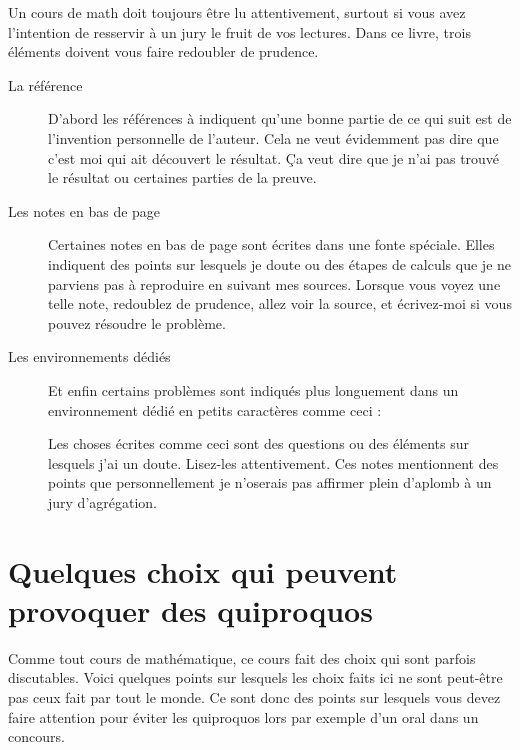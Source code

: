 Un cours de math doit toujours être lu attentivement, surtout si vous avez l'intention de resservir à un jury le fruit de vos lectures. Dans ce livre, trois éléments doivent vous faire redoubler de prudence.

\begin{description}
    \item[La référence \cite{MonCerveau}] 
        D'abord les références à \cite{MonCerveau} indiquent qu'une bonne partie de ce qui suit est de l'invention personnelle de l'auteur. Cela ne veut évidemment pas dire que c'est moi qui ait découvert le résultat. Ça veut dire que je n'ai pas trouvé le résultat ou certaines parties de la preuve.
    \item[Les notes en bas de page]
        Certaines notes en bas de page sont écrites dans une fonte spéciale. Elles indiquent des points sur lesquels je doute ou des étapes de calculs que je ne parviens pas à reproduire en suivant mes sources. Lorsque vous voyez une telle note, redoublez de prudence, allez voir la source, et écrivez-moi si vous pouvez résoudre le problème.
    \item[Les environnements dédiés]       
        Et enfin certains problèmes sont indiqués plus longuement dans un environnement dédié en petits caractères comme ceci :

        \begin{probleme}
            Les choses écrites comme ceci sont des questions ou des éléments sur lesquels j'ai un doute. Lisez-les attentivement. Ces notes mentionnent des points que personnellement je n'oserais pas affirmer plein d'aplomb à un jury d'agrégation.
        \end{probleme}
\end{description}

\section{Quelques choix qui peuvent provoquer des quiproquos}

Comme tout cours de mathématique, ce cours fait des choix qui sont parfois discutables. Voici quelques points sur lesquels les choix faits ici ne sont peut-être pas ceux fait par tout le monde. Ce sont donc des points sur lesquels vous devez faire attention pour éviter les quiproquos lors par exemple d'un oral dans un concours.

